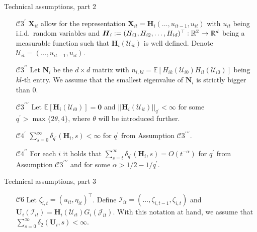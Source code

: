 \documentclass[10pt]{beamer}
\newcommand{\E}{\mathbb{E}}
\newcommand{\reals}{\mathbb{R}}
\newcommand{\X}{\boldsymbol{X}}
\begin{document}
\begin{frame}[label=tech_assumptions_2]{Technical assumptions, part 2}
\begin{enumerate}

\item[$\mathcal{C}3^\prime$] $ \X_{it}$ allow for the representation $ \X_{it} = \boldsymbol{H}_i(\ldots,u_{it-1},u_{it})$ with $u_{it}$ being i.i.d.\ random variables and $\boldsymbol{H}_i := (H_{i1}, H_{i2}, \ldots, H_{id})^\top:\linebreak \mathbb{R}^\mathbb{Z} \rightarrow \reals^d$ being a measurable function such that $\boldsymbol{H}_i(\mathcal{U}_{it})$ is well defined. Denote  $\mathcal{U}_{it} = (\ldots, u_{it-1}, u_{it})$.

\item[$\mathcal{C}3^{\prime\prime}$] Let $\boldsymbol{N}_i$ be the $d\times d$ matrix with $n_{i, kl}= \E[H_{ik}(\mathcal{U}_{i0})H_{il}(\mathcal{U}_{i0})]$ being $kl$-th entry. We assume that the smallest eigenvalue of $\boldsymbol{N}_i$ is strictly bigger than $0$.

\item[$\mathcal{C}3^{\prime\prime\prime}$]  Let $\E [\mathbf{H}_{i}(\mathcal{U}_{i0})]=\mathbf{0}$ and $||\mathbf{H}_{i}(\mathcal{U}_{it})||_{q^\prime} <\infty$ for some $q^\prime > \max\{ 2\theta, 4\}$, where $\theta$ will be introduced further.
\item[$\mathcal{C}4^\prime$] $\sum_{s=0}^\infty \delta_{q^\prime}(\mathbf{H}_i, s)<\infty$ for $q^\prime$ from Assumption $\mathcal{C}3^{\prime\prime\prime}$.
\item[$\mathcal{C}4^{\prime\prime}$] For each $i$ it holds that $\sum_{s=t}^{\infty} \delta_{q^\prime}(\mathbf{H}_{i}, s)= O(t^{-\alpha}) $ for $q^\prime$ from Assumption $\mathcal{C}3^{\prime\prime\prime}$ and for some $\alpha > 1/2 - 1/{q^\prime}$. \hyperlink{frame_assumptions<5>}{}

\end{enumerate}
\end{frame}

\begin{frame}[label=tech_assumptions_3]{Technical assumptions, part 3}
\begin{enumerate}

\item[$\mathcal{C}6$] Let $\zeta_{i, t} = (u_{it}, \eta_{it})^\top$. Define $\mathcal{I}_{it} = (\ldots, \zeta_{i, t-1}, \zeta_{i, t})$ and $\mathbf{U}_i(\mathcal{I}_{it}) =  \mathbf{H}_i(\mathcal{U}_{it})G_i(\mathcal{J}_{it})$. With this notation at hand, we assume that $\sum_{s=0}^\infty \delta_2(\mathbf{U}_i, s)<\infty$.\hyperlink{frame_assumptions<7>}{}
\end{enumerate}
\end{frame}
\end{document}
